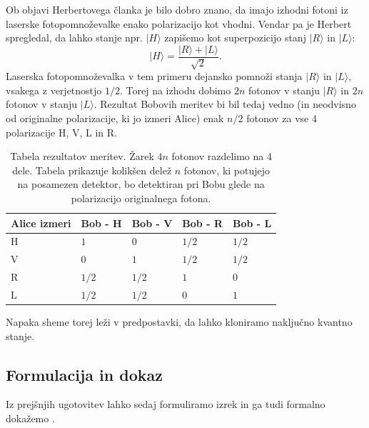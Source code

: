 \documentclass[12pt]{article}
\begin{document}
\par
Ob objavi Herbertovega članka je bilo dobro znano, da imajo izhodni fotoni iz laserske fotopomnoževalke enako polarizacijo kot vhodni. Vendar pa je Herbert spregledal, da lahko stanje npr. $| H \rangle$ zapišemo kot superpozicijo stanj $| R \rangle$ in $| L \rangle$:
\begin{equation}
| H \rangle = \frac{| R\rangle + | L \rangle}{\sqrt{2}}.
\end{equation} 
Laserska fotopomnoževalka v tem primeru dejansko pomnoži stanja $| R \rangle$ in $| L \rangle$, vsakega z verjetnostjo $1/2$. Torej na izhodu dobimo $2n$ fotonov v stanju $| R \rangle$ in $2n$ fotonov v stanju $| L \rangle$. Rezultat Bobovih meritev bi bil tedaj vedno (in neodvisno od originalne polarizacije, ki jo izmeri Alice) enak $n/2$ fotonov za vse 4 polarizacije H, V, L in R. \cite{marcocerezoEntangledParticlesFaster2015}

\begin{table}[]
\centering
\begin{tabular}{|l|l|l|l|l|}
\hline
\textbf{Alice izmeri} & \textbf{Bob - H} & \textbf{Bob - V} & \textbf{Bob - R} & \textbf{Bob - L} \\ \hline
H                     & $ 1 $            & $ 0 $            & $ 1/2 $ & $ 1/2 $ \\ \hline
V                     & $ 0 $            & $ 1 $            & $ 1/2 $ & $ 1/2 $ \\ \hline
R                     & $ 1/2 $          & $ 1/2 $          & $ 1 $   & $ 0 $   \\ \hline
L                     & $ 1/2 $          & $ 1/2 $          & $ 0 $   & $ 1 $   \\ \hline
\end{tabular}
\caption{Tabela rezultatov meritev. Žarek $4n$ fotonov razdelimo na 4 dele. Tabela prikazuje kolikšen delež $n$ fotonov, ki potujejo na posamezen detektor, bo detektiran pri Bobu glede na polarizacijo originalnega fotona.}
\label{tab:bob}
\end{table}

\par Napaka sheme torej leži v predpostavki, da lahko kloniramo naključno kvantno stanje.

 \subsection{Formulacija in dokaz}
 
 Iz prejšnjih ugotovitev lahko sedaj formuliramo izrek in ga tudi formalno dokažemo \cite{nielsenQuantumComputationQuantum2012}.
\end{document}
